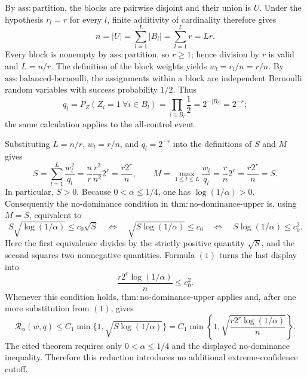 By \(\mathrm{ass{:}partition}\), the blocks are pairwise disjoint and their union is \(U\).  Under the hypothesis \(r_l=r\) for every \(l\), finite additivity of cardinality therefore gives
\[
n=|U|=\sum_{l=1}^L |B_l|=\sum_{l=1}^L r=Lr.
\]
Every block is nonempty by \(\mathrm{ass{:}partition}\), so \(r\ge 1\); hence division by \(r\) is valid and \(L=n/r\).  The definition of the block weights yields \(w_l=r_l/n=r/n\).  By \(\mathrm{ass{:}balanced\text{-}bernoulli}\), the assignments within a block are independent Bernoulli random variables with success probability \(1/2\).  Thus
\[
q_l=P_Z(Z_i=1\ \forall i\in B_l)
=\prod_{i\in B_l}\frac12
=2^{-|B_l|}=2^{-r};
\]
the same calculation applies to the all-control event.

Substituting \(L=n/r\), \(w_l=r/n\), and \(q_l=2^{-r}\) into the definitions of \(S\) and \(M\) gives
\[
S=\sum_{l=1}^L\frac{w_l^2}{q_l}
=\frac nr\frac{r^2}{n^2}2^r
=\frac{r2^r}{n},
\qquad
M=\max_{1\le l\le L}\frac{w_l}{q_l}
=\frac rn2^r
=\frac{r2^r}{n}=S.
\tag{1}
\]
In particular, \(S>0\).  Because \(0<\alpha\le 1/4\), one has \(\log(1/\alpha)>0\).  Consequently the no-dominance condition in \(\mathrm{thm{:}no\text{-}dominance\text{-}upper}\) is, using \(M=S\), equivalent to
\[
S\sqrt{\log(1/\alpha)}\le c_0\sqrt S
\quad\Longleftrightarrow\quad
\sqrt{S\log(1/\alpha)}\le c_0
\quad\Longleftrightarrow\quad
S\log(1/\alpha)\le c_0^2.
\]
Here the first equivalence divides by the strictly positive quantity \(\sqrt S\), and the second squares two nonnegative quantities.  Formula \((1)\) turns the last display into
\[
\frac{r2^r\log(1/\alpha)}{n}\le c_0^2.
\]
Whenever this condition holds, \(\mathrm{thm{:}no\text{-}dominance\text{-}upper}\) applies and, after one more substitution from \((1)\), gives
\[
\mathcal R_\alpha(w,q)
\le C_1\min\{1,\sqrt{S\log(1/\alpha)}\}
=C_1\min\left\{1,
\sqrt{\frac{r2^r\log(1/\alpha)}{n}}\right\}.
\]
The cited theorem requires only \(0<\alpha\le1/4\) and the displayed no-dominance inequality.  Therefore this reduction introduces no additional extreme-confidence cutoff.
